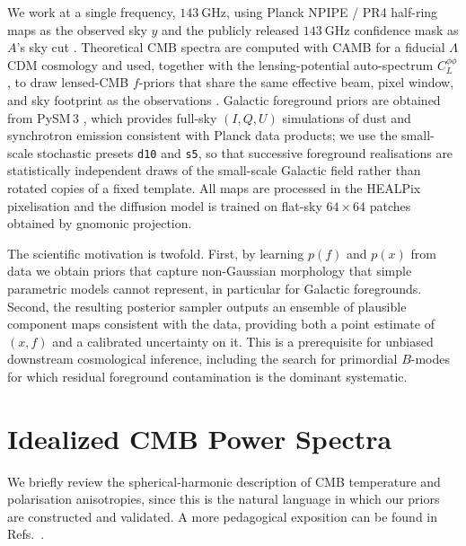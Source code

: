 \documentclass[11pt]{article}
\theoremstyle{definition}
\begin{document}
We work at a single frequency, $143\ \mathrm{GHz}$, using Planck NPIPE / PR4 half-ring maps as the observed sky $y$ and the publicly released $143\ \mathrm{GHz}$ confidence mask as $A$'s sky cut \cite{planck2018overview}. Theoretical CMB spectra are computed with CAMB \cite{lewis2000camb} for a fiducial $\Lambda$CDM cosmology and used, together with the lensing-potential auto-spectrum $C_L^{\phi\phi}$, to draw lensed-CMB $f$-priors that share the same effective beam, pixel window, and sky footprint as the observations \cite{sullivan2024methods,reinecke2023ducc}. Galactic foreground priors are obtained from PySM\,3 \cite{thorne2017pysm,zonca2021pysm3}, which provides full-sky $(I,Q,U)$ simulations of dust and synchrotron emission consistent with Planck data products; we use the small-scale stochastic presets \texttt{d10} and \texttt{s5}, so that successive foreground realisations are statistically independent draws of the small-scale Galactic field rather than rotated copies of a fixed template. All maps are processed in the HEALPix pixelisation \cite{gorski2005,zonca2019healpy} and the diffusion model is trained on flat-sky $64\times 64$ patches obtained by gnomonic projection.

The scientific motivation is twofold. First, by learning $p(f)$ and $p(x)$ from data we obtain priors that capture non-Gaussian morphology that simple parametric models cannot represent, in particular for Galactic foregrounds. Second, the resulting posterior sampler outputs an ensemble of plausible component maps consistent with the data, providing both a point estimate of $(x,f)$ and a calibrated uncertainty on it. This is a prerequisite for unbiased downstream cosmological inference, including the search for primordial $B$-modes for which residual foreground contamination is the dominant systematic.




\section{Idealized CMB Power Spectra}

We briefly review the spherical-harmonic description of CMB temperature and polarisation anisotropies, since this is the natural language in which our priors are constructed and validated. A more pedagogical exposition can be found in Refs.~\cite{scott2024pdg,sullivan2024methods,gorski2005}.
\end{document}
